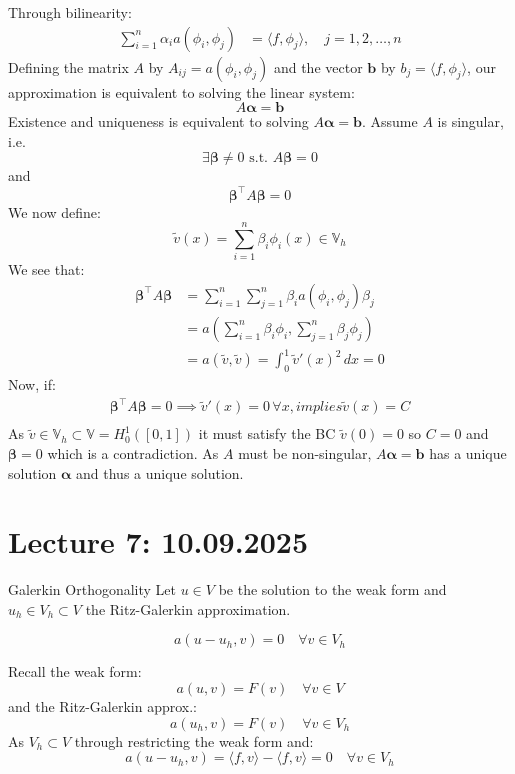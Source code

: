 Through bilinearity:
\begin{align*}
    \sum_{i=1}^n \alpha_i a(\phi_i, \phi_j) & = \langle f, \phi_j \rangle, \quad j = 1, 2, \ldots, n
\end{align*}
Defining the matrix $A$ by $A_{ij} = a(\phi_i, \phi_j)$ and the vector $\mathbf{b}$ by $b_j = \langle f, \phi_j \rangle$, our approximation is equivalent to solving the linear system:
\[A \symbf{\alpha} = \mathbf{b}\]
Existence and uniqueness is equivalent to solving $A \symbf{\alpha} = \mathbf{b}$.
Assume $A$ is singular, i.e.
\[
    \exists \symbf{\beta} \neq 0 \text{ s.t. } A \symbf{\beta} = 0
\]
and
\[
    \symbf{\beta}^\top A \symbf{\beta} = 0
\]
We now define:
\[
    \tilde{v}(x) = \sum_{i=1}^n \beta_i \phi_i(x) \in \mathbb{V}_h
\]
We see that:
\begin{align*}
    \symbf{\beta}^\top A \symbf{\beta} & = \sum_{i=1}^n \sum_{j=1}^n \beta_i a(\phi_i, \phi_j) \beta_j \\
                                       & = a(\sum_{i=1}^n \beta_i \phi_i, \sum_{j=1}^n \beta_j \phi_j) \\
                                       & = a(\tilde{v}, \tilde{v})= \int_0^1 \tilde{v}'(x)^2 \, dx = 0
\end{align*}
Now, if:
\begin{align*}
    \symbf{\beta}^\top A \symbf{\beta} = 0 \implies \tilde{v}'(x) = 0 \, \forall x, implies \tilde{v}(x) = C \\
\end{align*}
As $\tilde{v} \in \mathbb{V}_h \subset \mathbb{V} = H^1_0([0, 1])$ it must satisfy the BC $\tilde{v}(0) = 0$ so $C = 0$ and $\symbf{\beta} = 0$ which is a contradiction.
As $A$ must be non-singular, $A \symbf{\alpha} = \mathbf{b}$ has a unique solution $\symbf{\alpha}$ and thus a unique solution.

\section{Lecture 7: 10.09.2025}
\begin{lemma}{Galerkin Orthogonality}{}
    Let $u \in V$ be the solution to the weak form and $u_h \in V_h \subset V$ the Ritz-Galerkin approximation.

    \[
        a(u - u_h, v) = 0 \quad \forall v \in V_h
    \]
\end{lemma}
Recall the weak form:
\[
    a(u, v) = F(v) \quad \forall v \in V
\]
and the Ritz-Galerkin approx.:
\[
    a(u_h, v) = F(v) \quad \forall v \in V_h
\]
As $V_h \subset V$ through restricting the weak form and:
\[
    a(u - u_h, v) = \langle f, v \rangle - \langle f, v \rangle = 0 \quad \forall v \in V_h
\]

